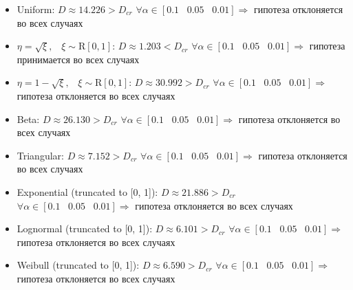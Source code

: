 \documentclass[a4paper, 14pt]{extarticle}
\begin{document}
\begin{itemize}
  \item Uniform: $D \approx 14.226 > D_{cr}$ $\forall \alpha \in [0.1 \hspace{10pt} 0.05 \hspace{10pt} 0.01] \Rightarrow$ гипотеза отклоняется во всех случаях
  \item $\eta = \sqrt{\xi}, \hspace{10pt} \xi \sim \text{R}[0,1]$: $D \approx 1.203 < D_{cr}$ $\forall \alpha \in [0.1 \hspace{10pt} 0.05 \hspace{10pt} 0.01] \Rightarrow$ гипотеза принимается во всех случаях
  \item $\eta = 1 - \sqrt{\xi}, \hspace{10pt} \xi \sim \text{R}[0,1]$: $D \approx 30.992 > D_{cr}$ $\forall \alpha \in [0.1 \hspace{10pt} 0.05 \hspace{10pt} 0.01] \Rightarrow$ гипотеза отклоняется во всех случаях
  \item Beta: $D \approx 26.130 > D_{cr}$ $\forall \alpha \in [0.1 \hspace{10pt} 0.05 \hspace{10pt} 0.01] \Rightarrow$ гипотеза отклоняется во всех случаях
  \item Triangular: $D \approx 7.152 > D_{cr}$ $\forall \alpha \in [0.1 \hspace{10pt} 0.05 \hspace{10pt} 0.01] \Rightarrow$ гипотеза отклоняется во всех случаях
  \item Exponential (truncated to [0, 1]): $D \approx 21.886 > D_{cr}$ $\forall \alpha \in [0.1 \hspace{10pt} 0.05 \hspace{10pt} 0.01] \Rightarrow$ гипотеза отклоняется во всех случаях
  \item Lognormal (truncated to [0, 1]): $D \approx 6.101 > D_{cr}$ $\forall \alpha \in [0.1 \hspace{10pt} 0.05 \hspace{10pt} 0.01] \Rightarrow$ гипотеза отклоняется во всех случаях
  \item Weibull (truncated to [0, 1]): $D \approx 6.590 > D_{cr}$ $\forall \alpha \in [0.1 \hspace{10pt} 0.05 \hspace{10pt} 0.01] \Rightarrow$ гипотеза отклоняется во всех случаях
\end{itemize}
\end{document}
